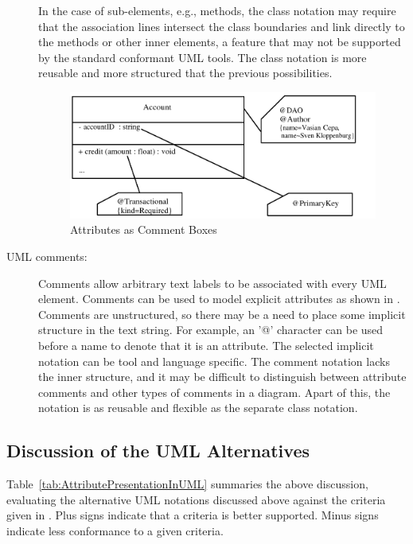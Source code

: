 \begin{description}
  In the case of sub-elements, e.g., methods, the class notation may require that the association lines intersect the class boundaries and link directly to the methods or other inner elements, a feature that may not be supported by the standard conformant UML tools. The class notation is more reusable and more structured that the previous possibilities.

\begin{figure}[ht]
		\centering
		\includegraphics[width=12cm,height=!]{append1/comment}
	\caption{Attributes as Comment Boxes}
	\label{fig:comment}
\end{figure}


\item[UML comments:] Comments allow arbitrary text labels to be associated with every
  UML element. Comments can be used to model explicit attributes
  as shown in . Comments are unstructured, so there may be a need to place some implicit structure in the text string. For example, an '@' character can be used before a name to denote that it is an attribute.
  The selected implicit notation can be tool and language specific. The comment notation lacks the inner structure, and it may be difficult to distinguish between attribute comments and other types of comments in a diagram. Apart of this, the notation is as reusable and flexible as the separate class notation.

\end{description}

\subsection{Discussion of the UML Alternatives}

Table~\ref{tab:AttributePresentationInUML} summaries the above discussion, evaluating the alternative UML notations discussed above against the criteria given in . Plus signs indicate that a criteria is better supported. Minus signs indicate less conformance to a given criteria.

